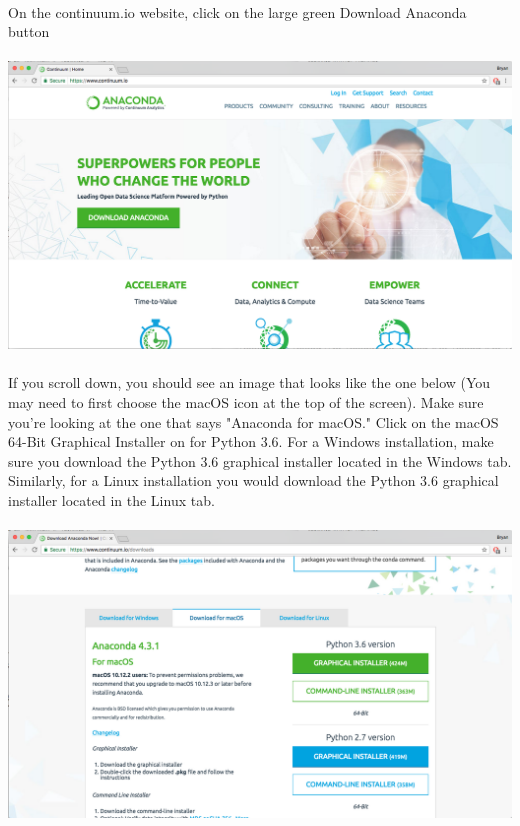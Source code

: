 \documentclass[]{article}
\begin{document}
\clearpage
\paragraph{}
On the continuum.io website, click on the large green Download Anaconda button
\paragraph{}
\begin{centering}
    \centerline{\includegraphics[scale=0.25]{Screenshot_2.png}}
\end{centering}

\paragraph{}
If you scroll down, you should see an image that looks like the one below (You may need to first choose the macOS icon at the top of the screen). Make sure you're looking at the one that says "Anaconda for macOS." Click on the macOS 64-Bit Graphical Installer on for Python 3.6. For a Windows installation, make sure you download the Python 3.6 graphical installer located in the Windows tab. Similarly, for a Linux installation you would download the Python 3.6 graphical installer located in the Linux tab.
\paragraph{}
\begin{centering}
    \centerline{\includegraphics[scale=0.25]{Screenshot_3.png}}
\end{centering}
\end{document}
